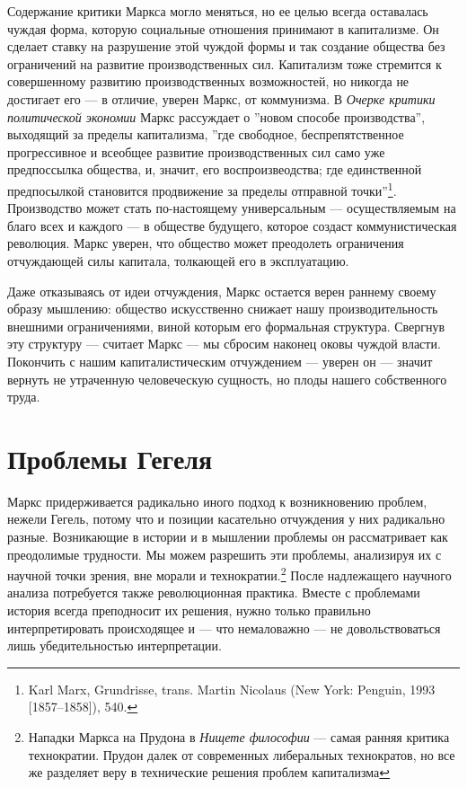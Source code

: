 \documentclass[12pt]{book}
\begin{document}
Содержание критики Маркса могло меняться, но ее целью всегда оставалась чуждая форма, которую социальные отношения принимают в капитализме. Он сделает ставку на разрушение этой чуждой формы и так создание общества без ограничений на развитие производственных сил. Капитализм тоже стремится к совершенному развитию производственных возможностей, но никогда не достигает его --- в отличие, уверен Маркс, от коммунизма. В \textit{Очерке критики политической экономии} Маркс рассуждает о ''новом способе производства'', выходящий за пределы капитализма, ''где свободное, беспрепятственное прогрессивное и всеобщее развитие производственных сил само уже предпоссылка общества, и, значит, его воспроизвеодства; где единственной предпосылкой становится продвижение за пределы отправной точки''\footnote{Karl Marx, Grundrisse, trans. Martin Nicolaus (New York: Penguin, 1993 [1857–1858]), 540.}. Производство может стать по-настоящему универсальным --- осуществляемым на благо всех и каждого --- в обществе будущего, которое создаст коммунистическая революция. Маркс уверен, что общество может преодолеть ограничения отчуждающей силы капитала, толкающей его в эксплуатацию.

Даже отказываясь от идеи отчуждения, Маркс остается верен раннему своему образу мышлению: общество искусственно снижает нашу производительность внешними ограничениями, виной которым его формальная структура. Свергнув эту структуру --- считает Маркс --- мы сбросим наконец оковы чуждой власти. Покончить с нашим капиталистическим отчуждением --- уверен он --- значит вернуть не утраченную человеческую сущность, но плоды нашего собственного труда.

\section{Проблемы Гегеля}

Маркс придерживается радикально иного подход к возникновению проблем, нежели Гегель, потому что и позиции касательно отчуждения у них радикально разные. Возникающие в истории и в мышлении проблемы он рассматривает как преодолимые трудности. Мы можем разрешить эти проблемы, анализируя их с научной точки зрения, вне морали и технократии.\footnote{Нападки Маркса на Прудона в \textit{Нищете философии} --- самая ранняя критика технократии. Прудон далек от современных либеральных технократов, но все же разделяет веру в технические решения проблем капитализма} После надлежащего научного анализа потребуется также революционная практика. Вместе с проблемами история всегда преподносит их решения, нужно только правильно интерпретировать происходящее и --- что немаловажно --- не довольствоваться лишь убедительностью интерпретации.
\end{document}
